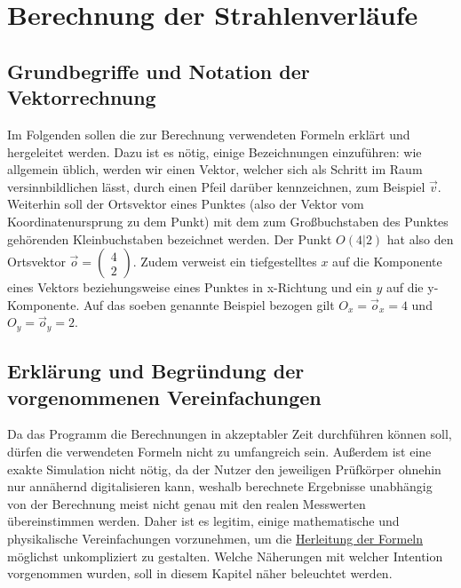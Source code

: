 \documentclass[reducespace,stylepage,semiarbeit]{spezidoc}
\newcommand{\vect}[2]{\begin{pmatrix}#1\\#2\end{pmatrix}}
\begin{document}
\newpage

\section{Berechnung der Strahlenverläufe}

\subsection{Grundbegriffe und Notation der Vektorrechnung}
Im Folgenden sollen die zur Berechnung verwendeten Formeln erklärt und hergeleitet werden. 
Dazu ist es nötig, einige Bezeichnungen einzuführen: wie allgemein üblich, werden wir einen Vektor, welcher sich als \glqq Schritt\grqq{} im Raum versinnbildlichen lässt, durch einen Pfeil darüber kennzeichnen, zum Beispiel $\vec{v}$. 
Weiterhin soll der Ortsvektor eines Punktes (also der Vektor vom Koordinatenursprung zu dem Punkt) mit dem zum Großbuchstaben des Punktes gehörenden Kleinbuchstaben bezeichnet werden. Der Punkt $O(4|2)$ hat also den Ortsvektor $\vec{o} = \vect{4}{2}$. 
Zudem verweist ein tiefgestelltes $x$ auf die Komponente eines Vektors beziehungsweise eines Punktes in x-Richtung und ein $y$ auf die y-Komponente. 
Auf das soeben genannte Beispiel bezogen gilt $O_x = \vec{o}_x = 4$ und $O_y = \vec{o}_y = 2$.

\subsection{Erklärung und Begründung der vorgenommenen Vereinfachungen}
Da das Programm die Berechnungen in akzeptabler Zeit durchführen können soll, dürfen die verwendeten Formeln nicht zu umfangreich sein. 
Außerdem ist eine exakte Simulation nicht nötig, da der Nutzer den jeweiligen Prüfkörper ohnehin nur annähernd digitalisieren kann, weshalb berechnete Ergebnisse unabhängig von der Berechnung meist nicht genau mit den realen Messwerten übereinstimmen werden. 
Daher ist es legitim, einige mathematische und physikalische Vereinfachungen vorzunehmen, um die \hyperref[sec:herleitung]{Herleitung der Formeln} möglichst unkompliziert zu gestalten. 
Welche Näherungen mit welcher Intention vorgenommen wurden, soll in diesem Kapitel näher beleuchtet werden.
\end{document}
